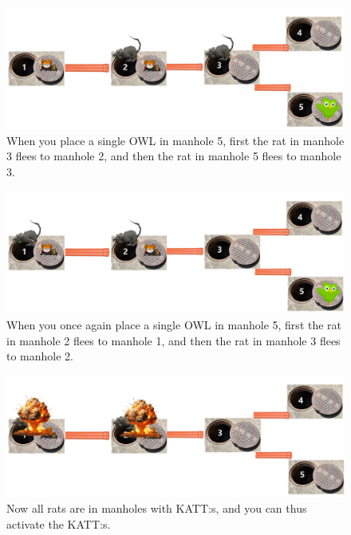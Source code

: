 \begin{centering}
  \begin{figure}[h]
    \centering
    \includegraphics[scale=0.2]{rats_graph step2.png}
    \caption{When you place a single OWL in manhole 5, first the rat in manhole 3 flees to manhole 2, and then the rat in manhole 5 flees to manhole 3.}
  \end{figure}
\end{centering}

\begin{centering}
  \begin{figure}[h]
    \centering
    \includegraphics[scale=0.2]{rats_graph step3.png}
    \caption{When you once again place a single OWL in manhole 5, first the rat in manhole 2 flees to manhole 1, and then the rat in manhole 3 flees to manhole 2.}
  \end{figure}
\end{centering}

\begin{centering}
  \begin{figure}[h]
    \centering
    \includegraphics[scale=0.2]{rats_graph step4 activate.png}
    \caption{Now all rats are in manholes with KATT:s, and you can thus activate the KATT:s.}
  \end{figure}
\end{centering}

